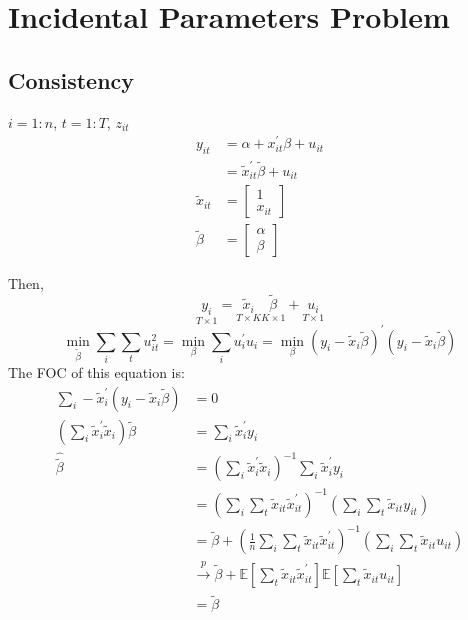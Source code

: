 \section{Incidental Parameters Problem}

\subsection{Consistency}
$i=1: n$, $t=1: T$, $z_{it} $
\begin{align*}
  y_{it} &= \alpha +x_{it}^{\prime} \beta +u_{it} \\
  &= \tilde{x}_{it}^{\prime} \tilde{\beta} + u_{it} \\
  \tilde{x}_{it} &= \begin{bmatrix}
    1 \\
    x_{it}
  \end{bmatrix} \\
  \tilde{\beta} &= \begin{bmatrix}
    \alpha \\
    \beta
  \end{bmatrix}
\end{align*}

Then, 
\[ 
\underset{T\times 1}{y_i} = \underset{T \times K}{\tilde{x}_i} \underset{K \times 1}{\tilde{\beta}} + \underset{T \times 1}{u_i}
\]
\[
\underset{\tilde{\beta}}{\min} \sum_i \sum_t u_{it}^2 = \underset{\beta}{\min} \sum_i u_i^{\prime} u_i = \underset{\beta}{\min} (y_i - \tilde{x}_i \tilde{\beta})^{\prime} (y_i - \tilde{x}_i \tilde{\beta})
\]
The FOC of this equation is:
\begin{align*}
  \sum_i -\tilde{x}_i^{\prime} (y_i - \tilde{x}_i \tilde{\beta}) &= 0 \\
  \left(\sum_i \tilde{x}_i^{\prime} \tilde{x}_i \right) \tilde{\beta} &= \sum_i \tilde{x}_i^{\prime} y_i \\
  \hat{\tilde{\beta}} &= \left(\sum_i \tilde{x}_i^{\prime} \tilde{x}_i \right)^{-1} \sum_i \tilde{x}_i^{\prime} y_i \\
  &= \left(\sum_i \sum_t \tilde{x}_{it} \tilde{x}_{it}^{\prime} \right)^{-1} \left( \sum_i \sum_t \tilde{x}_{it} y_{it} \right) \\
  &= \tilde{\beta} + \left(\frac{1}{n} \sum_i \sum_t \tilde{x}_{it} \tilde{x}_{it}^{\prime} \right)^{-1} \left( \sum_i \sum_t \tilde{x}_{it} u_{it} \right) \\
  & \overset{p}{\rightarrow} \tilde{\beta} + \mathbb{E}\left[\sum_t \tilde{x}_{it} \tilde{x}_{it}^{\prime} \right] \mathbb{E}\left[\sum_t \tilde{x}_{it} u_{it} \right] \\
  &= \tilde{\beta}
\end{align*}


